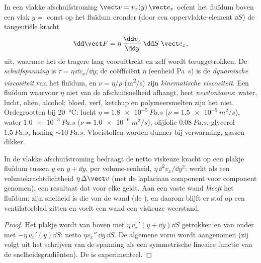 \begin{definition}\label{def:b2:viscous-flows:viscosity}
In een vlakke afschuifstroming $\vect v = v_x(y)\,\vect e_x$ oefent het
fluïdum boven een vlak $y = $ const op het fluïdum eronder (door een
oppervlakte-element $\dd S$) de tangentiële kracht
\[
\dd\vect F = \eta\,\frac{\dd v_x}{\dd y}\,\dd S\;\vect e_x ,
\]
uit, waarmee het de tragere laag vooruittrekt en zelf wordt teruggetrokken.
De \emph{schuifspanning} is $\tau = \eta\,\dd v_x/\dd y$; de coëfficiënt
$\eta$ (eenheid \unit{Pa.s}) is de \emph{dynamische viscositeit} van het
fluïdum, en $\nu = \eta/\rho$ (\unit{m^2/s}) zijn \emph{kinematische
viscositeit}. Een fluïdum waarvoor $\eta$ niet van de afschuifsnelheid
afhangt, heet \emph{newtoniaans}: water, lucht, oliën, alcohol; bloed, verf,
ketchup en polymeersmelten zijn het niet. Ordegrootten bij
\qty{20}{\degreeCelsius}: lucht $\eta =
\qty{1.8e-5}{Pa.s}$
($\nu = \qty{1.5e-5}{m^2/s}$), water $\qty{1.0e-3}{Pa.s}$
($\nu = \qty{1.0e-6}{m^2/s}$), olijfolie $\qty{0.08}{Pa.s}$, glycerol
$\qty{1.5}{Pa.s}$, honing $\sim\qty{10}{Pa.s}$. Vloeistoffen worden dunner
bij verwarming, gassen dikker.
\end{definition}

\begin{proposition}\label{prop:b2:viscous-flows:density}
In de vlakke afschuifstroming bedraagt de netto viskeuze kracht op een
plakje fluïdum tussen $y$ en $y + \dd y$, per volume-eenheid,
$\eta\,\dd^2v_x/\dd y^2$:  werkt als een volumekrachtdichtheid
$\eta\,\Delta\vect v$ (met de laplaciaan component voor component genomen),
een resultaat dat voor elke  geldt. Aan een vaste
wand \emph{kleeft} het fluïdum: zijn snelheid is die van de wand (de
\emph{}), en daarom blijft er stof op een ventilatorblad
zitten en voelt een wand een viskeuze weerstand.
\end{proposition}

\begin{proof}
Het plakje wordt van boven met $\eta\,v_x'(y + \dd y)\dd S$ getrokken en van
onder met $-\eta\,v_x'(y)\dd S$: netto $\eta v_x''\,\dd y\,\dd S$. De
algemene vorm wordt aangenomen (zij volgt uit het schrijven van de spanning
als een symmetrische lineaire functie van de snelheidsgradiënten). De
 is experimenteel.
\end{proof}

